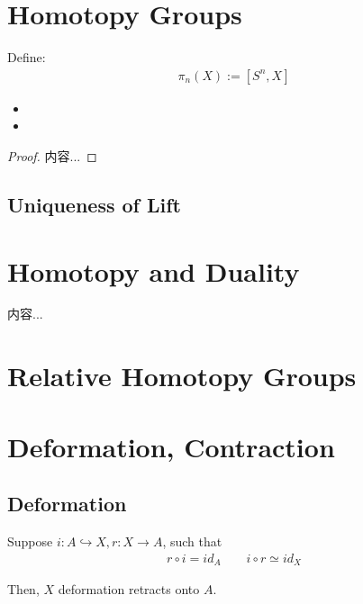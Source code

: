 \documentclass[Total.tex]{subfiles}
\begin{document}
		\section{Homotopy Groups}
			\begin{Def}
				Define:
				\begin{gather*}
					\pi_n(X):=[S^n,X]
				\end{gather*}
			\end{Def}
			
			\begin{theorem}
				\begin{itemize}
					\item 
					
					\item 
				\end{itemize}
			\end{theorem}
			\begin{proof}
				内容...
			\end{proof}
			
			\subsection{Uniqueness of Lift}
		\section{Homotopy and Duality}
			\begin{Def}
				内容...
			\end{Def}
		\section{Relative Homotopy Groups}
		\section{Deformation, Contraction}
			\subsection{Deformation}	
			\begin{Def}
				Suppose $i:A\hookrightarrow X,r:X\rightarrow A$, such that
				\begin{gather*}
					r\circ i=id_A\qquad i\circ r\simeq id_X
				\end{gather*}
				
				Then, $X$ deformation retracts onto $A$. 
			\end{Def}
			
\end{document}
